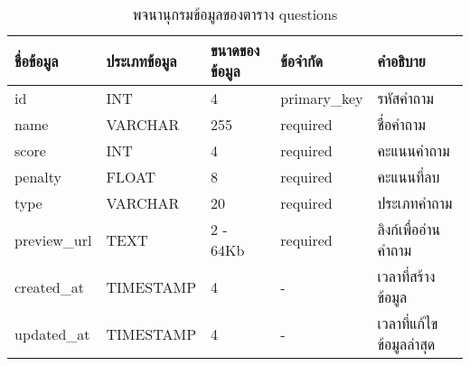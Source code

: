 \begin{table}[H]
    \caption{พจนานุกรมข้อมูลของตาราง questions}
    \label{tab:database-questions}
    \begin{tabularx}{\textwidth}{ | p{2.25cm} | p{2.20cm} | p{2.45cm} | p{2.05cm} | X | }
    \hline
    \textbf{ชื่อข้อมูล} & \textbf{ประเภทข้อมูล} & \textbf{ขนาดของข้อมูล} & \textbf{ข้อจำกัด} & \textbf{คำอธิบาย} \\
    \hline
    id & INT & 4 & primary\_key & รหัสคำถาม \\
    \hline
    name & VARCHAR & 255 & required & ชื่อคำถาม \\
    \hline
    score & INT & 4 & required & คะแนนคำถาม \\
    \hline
    penalty & FLOAT & 8 & required & คะแนนที่ลบ \\
    \hline
    type & VARCHAR & 20 & required & ประเภทคำถาม \\
    \hline
    preview\_url & TEXT & 2 - 64Kb & required & ลิงก์เพื่ออ่านคำถาม \\
    \hline
    created\_at & TIMESTAMP & 4 & - & เวลาที่สร้างข้อมูล \\
    \hline
    updated\_at & TIMESTAMP & 4 & - & เวลาที่แก้ไขข้อมูลล่าสุด \\
    \hline
    \end{tabularx}
\end{table}
